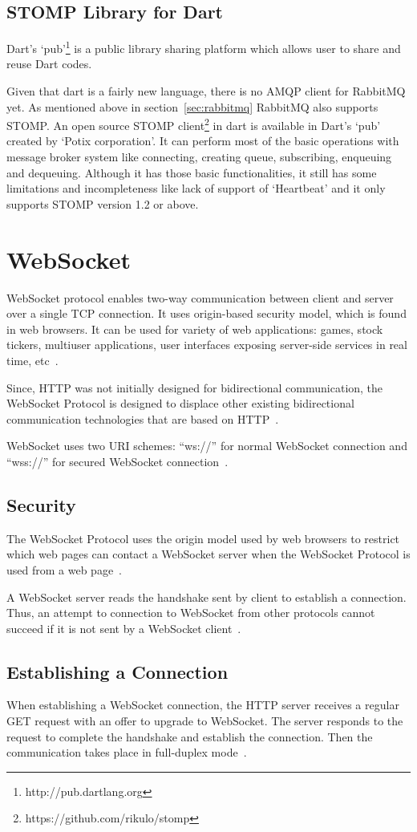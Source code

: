   \subsection{STOMP Library for Dart}
  \label{subsec:stompForDart}
  Dart's ‘pub’\footnote{http://pub.dartlang.org} is a public library sharing platform which allows user to share and reuse Dart codes.

  Given that dart is a fairly new language, there is no AMQP client for RabbitMQ yet. As mentioned above in section~\ref{sec:rabbitmq} RabbitMQ also supports STOMP. An open source STOMP client\footnote{https://github.com/rikulo/stomp} in dart is available in Dart's ‘pub’ created by ‘Potix corporation’. It can perform most of the basic operations with message broker system like connecting, creating queue, subscribing, enqueuing and dequeuing. Although it has those basic functionalities, it still has some limitations and incompleteness like lack of support of ‘Heartbeat’ and it only supports STOMP version 1.2 or above.


\section{WebSocket}
\label{sec:websocket}
  WebSocket protocol enables two-way communication between client and server over a single TCP connection. It uses origin-based security model, which is found in web browsers. It can be used for variety of web applications: games, stock tickers, multiuser applications, user interfaces exposing server-side services in real time, etc~\cite{rfc6455}.

  Since, HTTP was not initially designed for bidirectional communication, the WebSocket Protocol is designed to displace other existing bidirectional communication technologies that are based on HTTP~\cite{rfc6455}.

  WebSocket uses two URI schemes: “ws://” for normal WebSocket connection and “wss://” for secured WebSocket connection~\cite{rfc6455}.

\subsection{Security}
  The WebSocket Protocol uses the origin model used by web browsers to restrict which web pages can contact a WebSocket server when the WebSocket Protocol is used from a web page~\cite{rfc6455}.

   A WebSocket server reads the handshake sent by client to establish a connection. Thus, an attempt to connection to WebSocket from other protocols cannot succeed if it is not sent by a WebSocket client~\cite{rfc6455}.

\subsection{Establishing a Connection}
  When establishing a WebSocket connection, the HTTP server receives a regular GET request with an offer to upgrade to WebSocket. The server responds to the request to complete the handshake and establish the connection. Then the communication takes place in full-duplex mode~\cite{rfc6455}.
